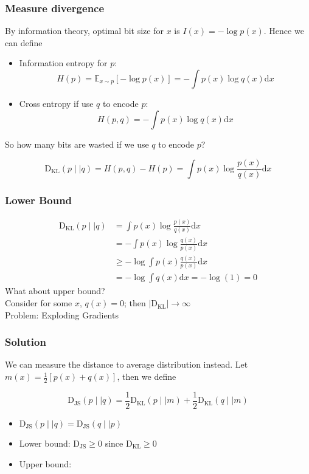 \documentclass{beamer}
\begin{document}
\begin{frame}[t]
\frametitle{Measure divergence}
By information theory, optimal bit size for $x$ is $I(x)=-\log p(x)$. Hence we can define
\begin{itemize}
\item Information entropy for $p$: $$H(p)=\mathbb{E}_{x\sim p}[-\log p(x)]=-\int p(x)\log q(x)\text{d}x$$
\item Cross entropy if use $q$ to encode $p$:
$$H(p, q)=-\int p(x)\log q(x)\text{d}x$$
\end{itemize}
So how many bits are wasted if we use $q$ to encode $p$?
\begin{tcolorbox}[colback=blue!1!white,
                  colframe=blue!75!black]
$$\mathrm{D_{KL}}(p\mid\mid q)=H(p,q)-H(p)=\int p(x)\log\frac{p(x)}{q(x)}\text{d}x$$
\end{tcolorbox}
\end{frame}

\begin{frame}[t]
\frametitle{Lower Bound}
\begin{align*}
\mathrm{D_{KL}}(p\mid\mid q)&=\int p(x)\log\frac{p(x)}{q(x)}\text{d}x\\
&=-\int p(x)\log\frac{q(x)}{p(x)}\text{d}x\\
&\ge -\log\int p(x)\frac{q(x)}{p(x)}\text{d}x\\
&=-\log\int q(x)\text{d}x=-\log(1)=0
\end{align*}
\vspace{1em}
What about upper bound?\\
\quad \quad Consider for some $x$, $q(x)=0$; then $|\mathrm{D_{KL}}|\longrightarrow\infty$\\
\quad \quad Problem: Exploding Gradients
\end{frame}

\begin{frame}[t]
\frametitle{Solution}
We can measure the distance to average distribution instead.
Let $m(x)=\frac{1}{2}[p(x)+q(x)]$, then we define
\begin{tcolorbox}[colback=blue!1!white,
                  colframe=blue!75!black]
$$\mathrm{D_{JS}}(p\mid\mid q)=\frac{1}{2}\mathrm{D_{KL}}(p\mid\mid m)+\frac{1}{2}\mathrm{D_{KL}}(q\mid\mid m)
$$
\end{tcolorbox}
\begin{itemize}
    \item $\mathrm{D_{JS}}(p\mid\mid q)=\mathrm{D_{JS}}(q\mid\mid p)$
    \item Lower bound: $\mathrm{D_{JS}}\ge 0$ since $\mathrm{D_{KL}}\ge 0$
    \item Upper bound:
\end{itemize}
\end{frame}
\end{document}
